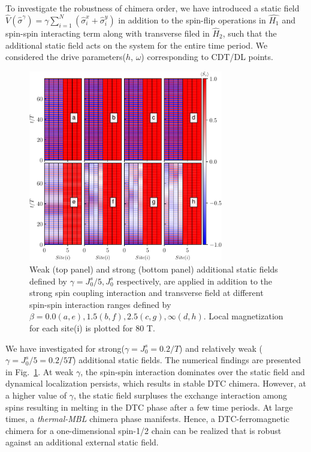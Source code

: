 \documentclass[%
reprint,
superscriptaddress,
amsmath,amssymb,showkeys,
aps,
prb,
]{revtex4-2}
\begin{document}
	To investigate the robustness of chimera order, we have introduced a static field $\displaystyle \hat{V}(\hat{\sigma}^\gamma) =\gamma \sum_{i=1}^{N} (\hat{\sigma}^x_i + \hat{\sigma}^y_i)$ in addition to the spin-flip operations in $\hat{H_1}$ and spin-spin interacting term along with transverse filed in $\hat{H}_2$, such that the additional static field acts on the system for the entire time period. We considered the drive parameters($h$, $\omega$) corresponding to CDT/DL points.
	\begin{figure}
		\begin{center}
			\includegraphics[width=8.5cm]{robustness_N_8.pdf}
		\end{center}
		\caption{Weak (top panel) and strong (bottom panel) additional static fields defined by $\gamma = J_0^s/5, J_0^s$ respectively, are applied in addition to the strong spin coupling interaction and transverse field at different spin-spin interaction ranges defined by $\beta = 0.0 (a,e), 1.5(b,f), 2.5(c,g), \infty(d,h)$. Local magnetization for each site(i) is plotted for 80 T.}
		\label{Fig:robustness}
	\end{figure}
	We have investigated for strong($\displaystyle \gamma= J_0^s=0.2/T$) and relatively weak ($\displaystyle \gamma= J_0^s/5=0.2/5T$) additional static fields. The numerical findings are presented in Fig.~\ref{Fig:robustness}. At weak $\gamma$, the spin-spin interaction dominates over the static field and dynamical localization persists, which results in stable DTC chimera. However, at a higher value of $\gamma$, the static field surpluses the exchange interaction among spins resulting in melting in  the DTC phase after a few time periods. At large times, a \textit{thermal-MBL} chimera phase manifests. Hence, a DTC-ferromagnetic chimera for a one-dimensional spin-1/2 chain can be realized that is robust against an additional external static field.	
	
\end{document}
